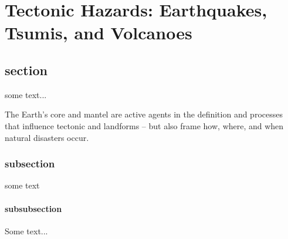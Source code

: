 \chapter{Tectonic Hazards: Earthquakes, Tsumis, and Volcanoes}

\section{section}

some text...

The Earth's core and mantel are active agents in the definition and processes that influence tectonic and landforms -- but also frame how, where, and when natural disasters occur. 

\subsection{subsection}

some text

\subsubsection{subsubsection}

Some text...